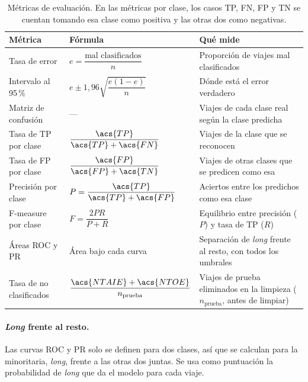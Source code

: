 \documentclass[12pt,a4paper]{article}
\begin{document}
\begin{table}[H]
\centering
\small
\renewcommand{\arraystretch}{1.3}
\begin{tabular}{>{\raggedright\arraybackslash}p{3.6cm} >{\centering\arraybackslash}p{4.4cm} >{\raggedright\arraybackslash}p{5.6cm}}
\toprule
\textbf{Métrica} & \textbf{Fórmula} & \textbf{Qué mide} \\
\midrule
Tasa de error & $e = \dfrac{\text{mal clasificados}}{n}$ & Proporción de viajes mal clasificados \\
Intervalo al 95\,\% & $e \pm 1{,}96\sqrt{\dfrac{e(1-e)}{n}}$ & Dónde está el error verdadero \\
Matriz de confusión & --- & Viajes de cada clase real según la clase predicha \\
Tasa de \acs{TP} por clase & $\dfrac{\acs{TP}}{\acs{TP} + \acs{FN}}$ & Viajes de la clase que se reconocen \\
Tasa de \acs{FP} por clase & $\dfrac{\acs{FP}}{\acs{FP} + \acs{TN}}$ & Viajes de otras clases que se predicen como esa \\
Precisión por clase & $P = \dfrac{\acs{TP}}{\acs{TP} + \acs{FP}}$ & Aciertos entre los predichos como esa clase \\
F-measure por clase & $F = \dfrac{2PR}{P+R}$ & Equilibrio entre precisión ($P$) y tasa de \acs{TP} ($R$) \\
Áreas \acs{ROC} y \acs{PR} & Área bajo cada curva & Separación de \textit{long} frente al resto, con todos los umbrales \\
Tasa de no clasificados & $\dfrac{\acs{NTAIE} + \acs{NTOE}}{n_{\text{prueba}}}$ & Viajes de prueba eliminados en la limpieza ($n_{\text{prueba}}$, antes de limpiar) \\
\bottomrule
\end{tabular}
\caption[Métricas de evaluación.]{Métricas de evaluación. En las métricas por clase, los casos \acf{TP}, \acf{FN}, \acf{FP} y \acf{TN} se cuentan tomando esa clase como positiva y las otras dos como negativas.}
\label{tab:metricas-eval}
\end{table}

\paragraph{\textit{Long} frente al resto.} Las curvas \acs{ROC} y \acs{PR}
solo se definen para dos clases, así que se calculan para la minoritaria,
\textit{long}, frente a las otras dos juntas. Se usa como puntuación la
probabilidad de \textit{long} que da el modelo para cada viaje.
\end{document}
